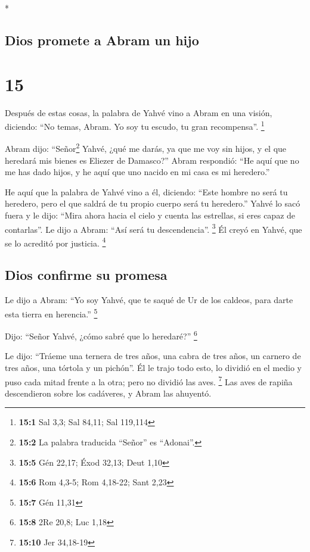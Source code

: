 \begin{paracol}{2}
\switchcolumn[0]*

\hypertarget{dios-promete-a-abram-un-hijo}{%
\subsection{Dios promete a Abram un
hijo}\label{dios-promete-a-abram-un-hijo}}

\hypertarget{section-28}{%
\section{15}\label{section-28}}

 Después de estas cosas, la palabra de Yahvé vino a Abram
en una visión, diciendo: ``No temas, Abram. Yo soy tu escudo, tu gran
recompensa''. \footnote{\textbf{15:1} Sal 3,3; Sal 84,11; Sal 119,114}

 Abram dijo: ``Señor\footnote{\textbf{15:2} La palabra
  traducida ``Señor'' es ``Adonai''.} Yahvé, ¿qué me darás, ya que me
voy sin hijos, y el que heredará mis bienes es Eliezer de Damasco?''
 Abram respondió: ``He aquí que no me has dado hijos, y he
aquí que uno nacido en mi casa es mi heredero.''

 He aquí que la palabra de Yahvé vino a él, diciendo:
``Este hombre no será tu heredero, pero el que saldrá de tu propio
cuerpo será tu heredero.''  Yahvé lo sacó fuera y le dijo:
``Mira ahora hacia el cielo y cuenta las estrellas, si eres capaz de
contarlas''. Le dijo a Abram: ``Así será tu descendencia''. \footnote{\textbf{15:5}
  Gén 22,17; Éxod 32,13; Deut 1,10}  Él creyó en Yahvé,
que se lo acreditó por justicia. \footnote{\textbf{15:6} Rom 4,3-5; Rom
  4,18-22; Sant 2,23}

\hypertarget{dios-confirme-su-promesa}{%
\subsection{Dios confirme su promesa}\label{dios-confirme-su-promesa}}

 Le dijo a Abram: ``Yo soy Yahvé, que te saqué de Ur de
los caldeos, para darte esta tierra en herencia.'' \footnote{\textbf{15:7}
  Gén 11,31}

 Dijo: ``Señor Yahvé, ¿cómo sabré que lo heredaré?''
\footnote{\textbf{15:8} 2Re 20,8; Luc 1,18}

 Le dijo: ``Tráeme una ternera de tres años, una cabra de
tres años, un carnero de tres años, una tórtola y un pichón''.
 Él le trajo todo esto, lo dividió en el medio y puso
cada mitad frente a la otra; pero no dividió las aves. \footnote{\textbf{15:10}
  Jer 34,18-19}  Las aves de rapiña descendieron sobre
los cadáveres, y Abram las ahuyentó.


\end{paracol}
